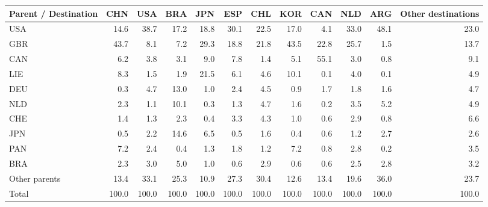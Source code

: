\begin{tabular}{lrrrrrrrrrrr}
\toprule
Parent / Destination & CHN & USA & BRA & JPN & ESP & CHL & KOR & CAN & NLD & ARG & Other destinations \\
\midrule
USA & 14.6 & 38.7 & 17.2 & 18.8 & 30.1 & 22.5 & 17.0 & 4.1 & 33.0 & 48.1 & 23.0 \\
GBR & 43.7 & 8.1 & 7.2 & 29.3 & 18.8 & 21.8 & 43.5 & 22.8 & 25.7 & 1.5 & 13.7 \\
CAN & 6.2 & 3.8 & 3.1 & 9.0 & 7.8 & 1.4 & 5.1 & 55.1 & 3.0 & 0.8 & 9.1 \\
LIE & 8.3 & 1.5 & 1.9 & 21.5 & 6.1 & 4.6 & 10.1 & 0.1 & 4.0 & 0.1 & 4.9 \\
DEU & 0.3 & 4.7 & 13.0 & 1.0 & 2.4 & 4.5 & 0.9 & 1.7 & 1.8 & 1.6 & 4.7 \\
NLD & 2.3 & 1.1 & 10.1 & 0.3 & 1.3 & 4.7 & 1.6 & 0.2 & 3.5 & 5.2 & 4.9 \\
CHE & 1.4 & 1.3 & 2.3 & 0.4 & 3.3 & 4.3 & 1.0 & 0.6 & 2.9 & 0.8 & 6.6 \\
JPN & 0.5 & 2.2 & 14.6 & 6.5 & 0.5 & 1.6 & 0.4 & 0.6 & 1.2 & 2.7 & 2.6 \\
PAN & 7.2 & 2.4 & 0.4 & 1.3 & 1.8 & 1.2 & 7.2 & 0.8 & 2.8 & 0.2 & 3.5 \\
BRA & 2.3 & 3.0 & 5.0 & 1.0 & 0.6 & 2.9 & 0.6 & 0.6 & 2.5 & 2.8 & 3.2 \\
Other parents & 13.4 & 33.1 & 25.3 & 10.9 & 27.3 & 30.4 & 12.6 & 13.4 & 19.6 & 36.0 & 23.7 \\
\midrule
Total & 100.0 & 100.0 & 100.0 & 100.0 & 100.0 & 100.0 & 100.0 & 100.0 & 100.0 & 100.0 & 100.0 \\
\bottomrule
\end{tabular}
